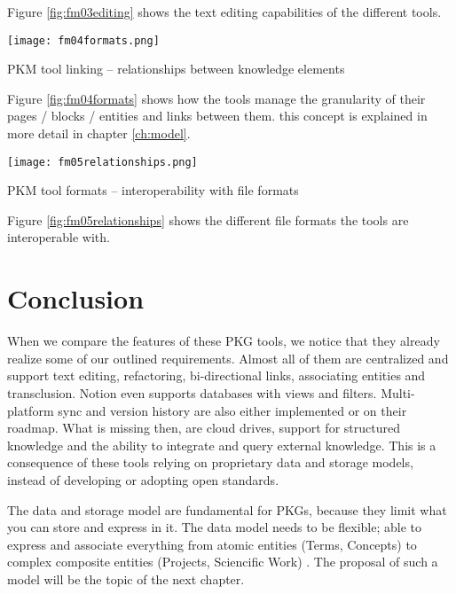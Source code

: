Figure \ref{fig:fm03editing} shows the text editing capabilities of the different tools.


\begin{table}[H]
    \centering
    \texttt{[image: fm04formats.png]}
    \caption{PKM tool linking -- relationships between knowledge elements}
    \label{fig:fm04formats}
\end{table}

Figure \ref{fig:fm04formats} shows how the tools manage the granularity of their pages / blocks / entities and links between them. this concept is explained in more detail in chapter \ref{ch:model}.


\begin{table}[H]
    \centering
    \texttt{[image: fm05relationships.png]}
    \caption{PKM tool formats -- interoperability with file formats}
    \label{fig:fm05relationships}
\end{table}

Figure \ref{fig:fm05relationships} shows the different file formats the tools are interoperable with.

\section{Conclusion}

When we compare the features of these PKG tools, we notice that they already realize some of our outlined requirements. Almost all of them are centralized and support text editing, refactoring, bi-directional links, associating entities and transclusion. Notion even supports databases with views and filters. Multi-platform sync and version history are also either implemented or on their roadmap. What is missing then, are cloud drives, support for structured knowledge and the ability to integrate and query external knowledge. This is a consequence of these tools relying on proprietary data and storage models, instead of developing or adopting open standards.

The data and storage model are fundamental for PKGs, because they limit what you can store and express in it. The data model needs to be flexible; able to express and associate everything from atomic entities (Terms, Concepts) to complex composite entities (Projects, Sciencific Work) \cite{Davies2005Memex60}. The proposal of such a model will be the topic of the next chapter.